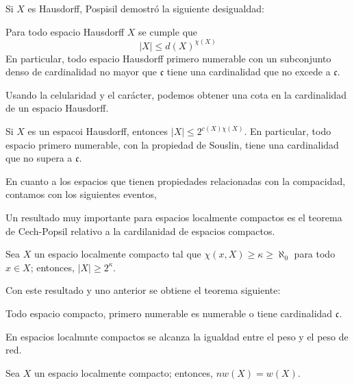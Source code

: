 \documentclass[12pt]{report}
\theoremstyle{largebreak}
\newcommand\abs[1]{\ensuremath{\lvert#1\rvert}}
\begin{document}
    Si $X$ es Hausdorff, Pospisil demostró la siguiente desigualdad:

    \begin{theor}
        Para todo espacio Hausdorff $X$ se cumple que
        \begin{equation*}
            \abs{X}\leq d(X)^{\chi(X)}
        \end{equation*}
        En particular, todo espacio Hausdorff primero numerable con un subconjunto denso de cardinalidad no mayor que $\mathfrak{c}$ tiene una cardinalidad que no excede a $\mathfrak{c}$.
    \end{theor}

    Usando la celularidad y el carácter, podemos obtener una cota en la cardinalidad de un espacio Hausdorff.

    \begin{theor}
        Si $X$ es un espacoi Hausdorff, entonces $\abs{X}\leq 2^{ c(X)\chi(X)}$. En particular, todo espacio primero numerable, con la propiedad de Souslin, tiene una cardinalidad que no supera a $\mathfrak{c}$.
    \end{theor}

    En cuanto a los espacios que tienen propiedades relacionadas con la compacidad, contamos con los siguientes eventos,

    Un resultado muy importante para espacios localmente compactos es el teorema de Cech-Popsil relativo a la cardilanidad de espacios compactos.

    \begin{theor}
        Sea $X$ un espacio localmente compacto tal que $\chi(x,X)\geq\kappa\geq\aleph_0$ para todo $x\in X$; entonces, $\abs{X}\geq 2^{\kappa}$.
    \end{theor}

    Con este resultado y uno anterior se obtiene el teorema siguiente:
    
    \begin{cor}
        Todo espacio compacto, primero numerable es numerable o tiene cardinalidad $\mathfrak{c}$.
    \end{cor}

    En espacios localmnte compactos se alcanza la igualdad entre el peso y el peso de red.

    \begin{theor}
        Sea $X$ un espacio localmente compacto; entonces, $nw(X)=w(X)$.
    \end{theor}
\end{document}
